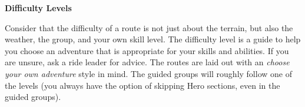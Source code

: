 \documentclass{article}
\begin{document}
\hfill%

\begin{minipage}[t]{1\linewidth}
    \textbf{Difficulty Levels}

    Consider that the difficulty of a route is not just about the terrain, but also the weather, the group, and your own skill level. The difficulty level is a guide to help you choose an adventure that is appropriate for your skills and abilities. If you are unsure, ask a ride leader for advice.
    \vspace{0.2em}
    The routes are laid out with an \textit{choose your own adventure} style in mind. The guided groups will roughly follow one of the levels (you always have the option of skipping Hero sections, even in the guided groups).
    \vspace{0.5em}


\end{minipage}
\end{document}
